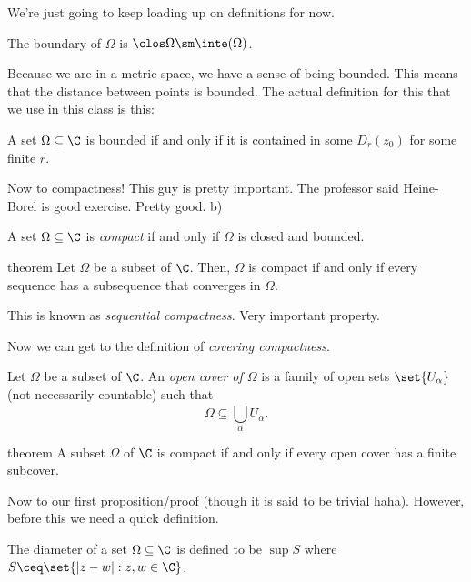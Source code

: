 \documentclass[class=article, crop=false]{standalone}
\begin{document}
We're just going to keep loading up on definitions for now.

\begin{defn}
  The boundary of $\Omega$ is $\clos \Omega \sm \inte(\Omega)$.
\end{defn}

Because we are in a metric space, we have a sense of being bounded. This means that the distance between points is bounded. The actual definition for this that we use in this class is this:

\begin{defn}
  A set $\Omega \subseteq \C$ is bounded if and only if it is contained in some $D_r(z_0)$ for some finite $r$.
\end{defn}

Now to compactness! This guy is pretty important. The professor said Heine-Borel is good exercise. Pretty good. b)

\begin{defn}
  A set $\Omega \subseteq \C$ is \emph{compact} if and only if $\Omega$ is closed and bounded.
\end{defn}

\begin{result}{theorem}
  Let $\Omega$ be a subset of $\C$. Then, $\Omega$ is compact if and only if every sequence has a subsequence that converges in $\Omega$.
\end{result}
\begin{rem}
  This is known as \emph{sequential compactness}. Very important property.
\end{rem}

Now we can get to the definition of \emph{covering compactness}.

\begin{defn}
  Let $\Omega$ be a subset of $\C$. An \emph{open cover of $\Omega$} is a family of open sets $\set{U_\alpha}$ (not necessarily countable) such that
    \[
      \Omega \subseteq \bigcup_{\alpha}^{} U_\alpha.
    \]
\end{defn}

\begin{result}{theorem}
  A subset $\Omega$ of $\C$ is compact if and only if every open cover has a finite subcover.
\end{result}

Now to our first proposition/proof (though it is said to be trivial haha). However, before this we need a quick definition.

\begin{defn}
  The diameter of a set $\Omega\subseteq\C$ is defined to be $\sup S$ where $S \ceq \set{|z-w| : z,w \in \C}$.
\end{defn}
\end{document}
